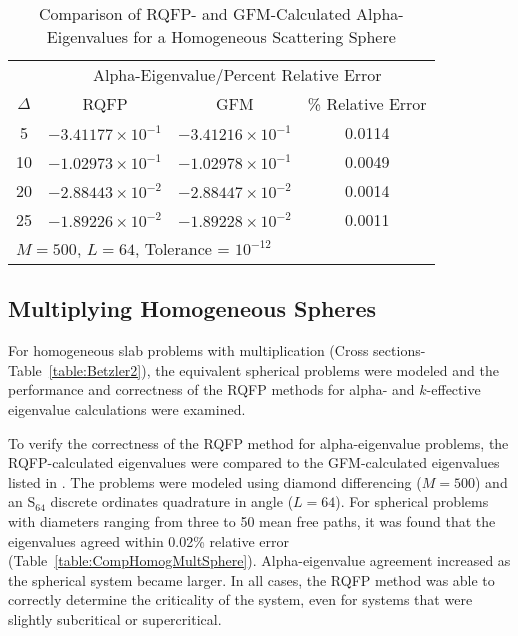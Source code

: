 \begin{table*}[!htbp]
\centering{}
\caption{Comparison of RQFP- and GFM-Calculated Alpha-Eigenvalues for a Homogeneous Scattering Sphere}
\label{table:CompHomogScattSphere}
\begin{tabular}{@{}cccc@{}}\toprule
& \multicolumn{3}{c}{Alpha-Eigenvalue/Percent Relative Error} \\
\cmidrule{2-4} $\Delta$ & RQFP & GFM & \% Relative Error \\
\midrule
5 & $-3.41177 \times 10^{-1}$ & $-3.41216 \times 10^{-1}$ & 0.0114 \\ 
10 & $-1.02973 \times 10^{-1}$ & $-1.02978 \times 10^{-1}$ & 0.0049 \\ 
20 & $-2.88443 \times 10^{-2}$ & $-2.88447 \times 10^{-2}$ & 0.0014 \\ 
25 & $-1.89226 \times 10^{-2}$ & $-1.89228 \times 10^{-2}$ & 0.0011 \\ 
\bottomrule
\multicolumn{4}{l}{$M = 500$, $L = 64$, Tolerance = $10^{-12}$} \\
\end{tabular}
\end{table*}

\subsection{Multiplying Homogeneous Spheres}

For homogeneous slab problems with multiplication (Cross sections-Table~\ref{table:Betzler2}), the equivalent spherical problems were modeled and the performance and correctness of the RQFP methods for alpha- and $k$-effective eigenvalue calculations were examined.

To verify the correctness of the RQFP method for alpha-eigenvalue problems, the RQFP-calculated eigenvalues were compared to the GFM-calculated eigenvalues listed in \cite{kornreich_greens_1997}. The problems were modeled using diamond differencing ($M=500$) and an S$_{64}$ discrete ordinates quadrature in angle ($L=64$). For spherical problems with diameters ranging from three to 50 mean free paths, it was found that the eigenvalues agreed within 0.02\% relative error (Table~\ref{table:CompHomogMultSphere}). Alpha-eigenvalue agreement increased as the spherical system became larger. In all cases, the RQFP method was able to correctly determine the criticality of the system, even for systems that were slightly subcritical or supercritical.

